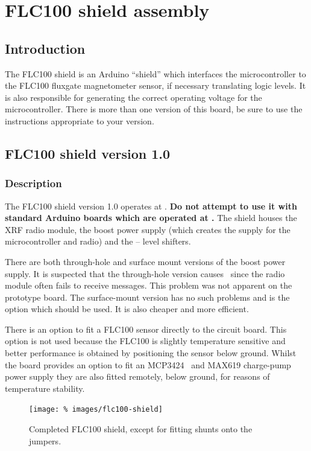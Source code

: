 \chapter{FLC100 shield assembly}

\section{Introduction}
The FLC100 shield is an Arduino ``shield'' which interfaces the
microcontroller to the FLC100 fluxgate magnetometer sensor, if
necessary translating logic levels. It is also responsible for
generating the correct operating voltage for the
microcontroller. There is more than one version of this board, be sure
to use the instructions appropriate to your version.

\section{FLC100 shield version 1.0}

\subsection{Description}

The FLC100 shield version 1.0 operates at . \textbf{Do not
  attempt to use it with standard Arduino boards which are operated at
  .} The shield houses the XRF radio module, the boost power
supply (which creates the  supply for the microcontroller
and radio) and the  --  level shifters.

There are both through-hole and surface mount versions of the boost
power supply. It is suspected that the through-hole version causes
\rfi\ since the radio module often fails to receive messages. This
problem was not apparent on the prototype board. The surface-mount
version has no such problems and is the option which should be
used. It is also cheaper and more efficient.

There is an option to fit a FLC100 sensor directly to the circuit
board. This option is not used because the FLC100 is slightly
temperature sensitive and better performance is obtained by
positioning the sensor below ground. Whilst the board provides an
option to fit an MCP3424 \adc\ and MAX619 charge-pump power supply they
are also fitted remotely, below ground, for reasons of temperature
stability.


\begin{figure}
  \centering
  \texttt{[image: \%
    images/flc100-shield]}
  \caption[Completed FLC100 shield]{Completed FLC100 shield, except
    for fitting shunts onto the jumpers. %
    }
  \label{fig:flc100-v1.0}
\end{figure}

